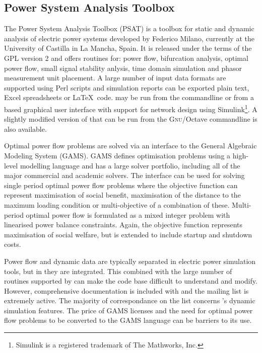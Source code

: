 \subsection{Power System Analysis Toolbox}
\label{sec:psat}
The Power System Analysis Toolbox (PSAT) is a \matlab toolbox for static and
dynamic analysis of electric power systems developed by Federico Milano,
currently at the University of Castilla in La Mancha, Spain.  It is released
under the terms of the GPL version 2 and offers routines for:
power flow, bifurcation analysis, optimal power flow, small signal stability anlysis, time
domain simulation and phasor measurement unit placement.  A large number of
input data formats are supported using Perl scripts and simulation reports can
be exported plain text, Excel spreadsheets or \LaTeX~code.  \psat may be run
from the \matlab commandline or from a \matlab based graphical user interface
with support for network design using Simulink\footnote{Simulink is a
registered trademark of The Mathworks, Inc.}.  A slightly modified version of
\psat that can be run from the \textsc{Gnu}/Octave commandline is also
available.

Optimal power flow problems are solved via an interface to the General
Algebraic Modeling System (GAMS).  GAMS defines optimisation
problems using a high-level modelling language and has a large solver portfolio, including all
of the major commercial and academic solvers.  The interface can be used for
solving single period optimal power flow problems where the objective function
can represent maximisation of social benefit, maximisation of the distance to
the maximum loading condition or multi-objective of a combination of these.
Multi-period optimal power flow is formulated as a mixed integer problem with
linearised power balance constraints.  Again, the objective function represents
maximisation of social welfare, but is extended to include startup and
shutdown costs.

Power flow and dynamic data are typically separated in electric power
simulation tools, but in \psat they are integrated.  This combined with the
large number of routines supported by \psat can make the code base difficult to
understand and modify.  However, comprehensive documentation is included with
\psat and the mailing list is extremely active.  The majority of correspondance
on the list concerns \psat's dynamic simulation features.  The price of
GAMS licenses and the need for optimal power flow problems to be converted to
the GAMS language can be barriers to its use.

